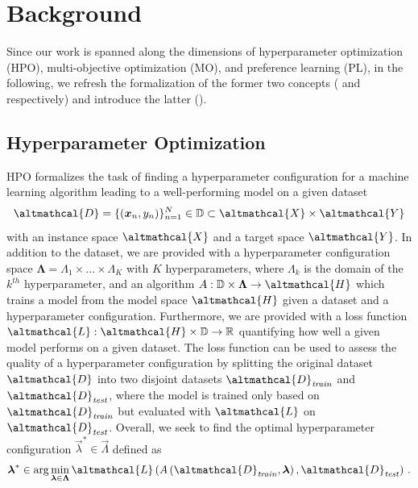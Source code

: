 \section{Background}
\label{moo-sec:background}

Since our work is spanned along the dimensions of hyperparameter optimization (HPO), multi-objective optimization (MO), and preference learning (PL), in the following, we refresh the formalization of the former two concepts ( and  respectively) and introduce the latter ().

\subsection{Hyperparameter Optimization} \label{moo-ssec:hpo}
HPO formalizes the task of finding a hyperparameter configuration for a machine learning algorithm leading to a well-performing model on a given dataset 
\begin{equation}
    \altmathcal{D} = \{(\vec{x}_n, y_n)\}_{n=1}^N \in \mathbb{D} \subset \altmathcal{X} \times \altmathcal{Y}
\end{equation}
with an instance space $\altmathcal{X}$ and a target space $\altmathcal{Y}$. 
In addition to the dataset, we are provided with a hyperparameter configuration space $\boldsymbol{\Lambda} = \Lambda_1 \times \dots \times \Lambda_K$ with $K$ hyperparameters, where $\Lambda_k$ is the domain of the $k^{\mathit{th}}$ hyperparameter, and an algorithm $A: \mathbb{D} \times \vec{\Lambda} \rightarrow \altmathcal{H}$ which trains a model from the model space $\altmathcal{H}$ given a dataset and a hyperparameter configuration. 
Furthermore, we are provided with a loss function $\altmathcal{L}: \altmathcal{H} \times \mathbb{D} \rightarrow \mathbb{R}$ quantifying how well a given model performs on a given dataset. 
The loss function can be used to assess the quality of a hyperparameter configuration by splitting the original dataset $\altmathcal{D}$ into two disjoint datasets $\altmathcal{D}_\mathit{train}$ and $\altmathcal{D}_\mathit{test}$, where the model is trained only based on $\altmathcal{D}_\mathit{train}$ but evaluated with $\altmathcal{L}$ on $\altmathcal{D}_\mathit{test}$. 
Overall, we seek to find the optimal hyperparameter configuration $\vec{\lambda}^* \in \vec{\Lambda}$ defined as 
\begin{equation}\label{moo-eq:hpo}
    \vec{\lambda}^* \in \arg\min_{\vec{\lambda} \in \vec{\Lambda}} \altmathcal{L}\left( A \left( \altmathcal{D}_{\mathit{train}}, \vec{\lambda} \right), \altmathcal{D}_\mathit{test} \right) \, .
\end{equation}

